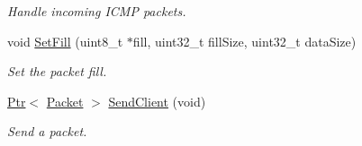\begin{DoxyCompactItemize}
\begin{DoxyCompactList}\small\item\em Handle incoming I\+C\+MP packets. \end{DoxyCompactList}\item 
void \hyperlink{classIpv4FragmentationTest_af2de35c56cd4b51230784881bd1221a8}{Set\+Fill} (uint8\+\_\+t $\ast$fill, uint32\+\_\+t fill\+Size, uint32\+\_\+t data\+Size)
\begin{DoxyCompactList}\small\item\em Set the packet fill. \end{DoxyCompactList}\item 
\hyperlink{classns3_1_1Ptr}{Ptr}$<$ \hyperlink{classns3_1_1Packet}{Packet} $>$ \hyperlink{classIpv4FragmentationTest_a3df0b70a39a1fec9205b40f47a64ab6f}{Send\+Client} (void)
\begin{DoxyCompactList}\small\item\em Send a packet. \end{DoxyCompactList}\end{DoxyCompactItemize}
